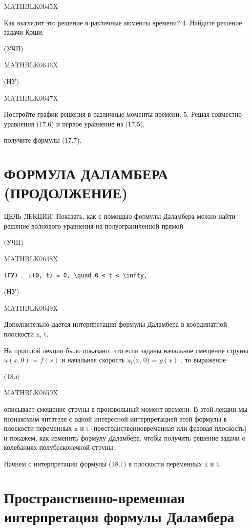 \documentclass[
]{article}
\begin{document}
MATHBLK0645X

Как выглядит это решение в различные моменты времени? 4. Найдите решение
задачи Коши:

(УЧП)

MATHBLK0646X

(НУ)

MATHBLK0647X

Постройте график решения в различные моменты времени. 5. Решая совместно
уравнения (17.6) и первое уравнение из (17.5),

получите формулы (17.7).

\section{ФОРМУЛА ДАЛАМБЕРА
(ПРОДОЛЖЕНИЕ)}\label{ux444ux43eux440ux43cux443ux43bux430-ux434ux430ux43bux430ux43cux431ux435ux440ux430-ux43fux440ux43eux434ux43eux43bux436ux435ux43dux438ux435}

ЦЕЛЬ ЛЕКЦИИ! Показать, как с помощью формулы Даламбера можно найти
решение волнового уравнения на полуограниченной прямой

(УЧП)

MATHBLK0648X

\begin{verbatim}
(ГУ)   u(0, t) = 0, \quad 0 < t < \infty,
\end{verbatim}

(НУ)

MATHBLK0649X

Дополнительно дается интерпретация формулы Даламбера в координатной
плоскости x, t.

На прошлой лекции было показано, что если заданы начальное смещение
струны \(u(x, 0)\) = \(f(x)\) и начальная скорость \(u_t\)(x, 0) =
\(g(x)\) , то выражение

(18.i)

MATHBLK0650X

описывает смещение струны в произвольный момент времени. В этой лекции
мы познакомим читателя с одной интересной интерпретацией этой формулы в
плоскости переменных x и t (пространственновременная или фазовая
плоскость) и покажем, как изменить формулу Даламбера, чтобы получить
решение задачи о колебаниях полубесконечной струны.

Начнем с интерпретации формулы (18.1) в плоскости переменных x и t.

\section{Пространственно-временная интерпретация формулы
Даламбера}\label{ux43fux440ux43eux441ux442ux440ux430ux43dux441ux442ux432ux435ux43dux43dux43e-ux432ux440ux435ux43cux435ux43dux43dux430ux44f-ux438ux43dux442ux435ux440ux43fux440ux435ux442ux430ux446ux438ux44f-ux444ux43eux440ux43cux443ux43bux44b-ux434ux430ux43bux430ux43cux431ux435ux440ux430}
\end{document}
